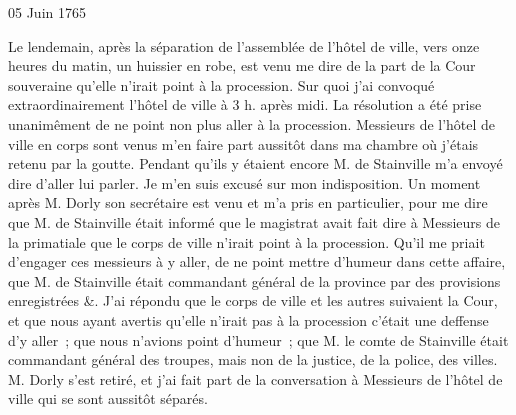                      \begin{diary}{05 Juin 1765}{}
                        
                         Le lendemain, après la séparation de
                           l'assemblée
                           de l'hôtel de ville, vers onze
                           heures du matin, un
                           huissier en robe, est venu me dire de la part de
                           la Cour souveraine qu'elle
                           n'irait point à la
                           procession. Sur quoi j'ai convoqué extraordinairement
                           l'hôtel de ville à 3 h. après midi. La résolution a été prise unanimêment de ne point non plus
                           aller à la procession. Messieurs de l'hôtel
                              de ville
                           en corps sont venus m'en faire part aussitôt
                           dans ma chambre où j'étais retenu par la goutte.
                           Pendant qu'ils y étaient encore M.
                              de Stainville
                           m'a envoyé dire d'aller lui parler. Je m'en suis
                           excusé sur mon indisposition. Un moment après
                           M. Dorly son secrétaire est
                           venu et m'a pris
                           en particulier, pour me dire que M. de
                              Stainville
                           était informé que le magistrat avait fait dire
                           à Messieurs de la primatiale que le corps de ville
                           n'irait point à la procession. Qu'il me priait
                           d'engager ces messieurs à y aller, de ne point
                           mettre d'humeur dans cette affaire, que M. de
                              Stainville était commandant général de la
                           province
                           par des provisions enregistrées &. J'ai répondu
                           que le corps de ville et
                           les autres suivaient la
                           Cour, et que nous ayant avertis qu'elle n'irait
                           pas à la procession c'était une deffense d'y aller ;
                           que nous n'avions point d'humeur ; que M. le
                              comte de Stainville était commandant
                           général des
                           troupes, mais non de la justice, de la police,
                           des villes. M. Dorly s'est retiré,
                           et j'ai fait
                           part de la conversation à Messieurs de l'hôtel de ville
                           qui se sont aussitôt séparés. \bigskip
        

\end{diary}
